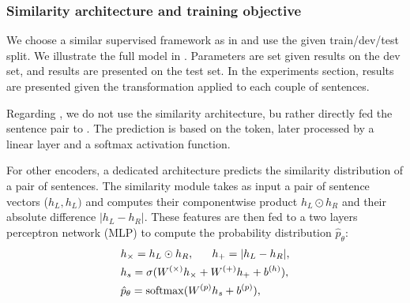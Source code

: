 \subsubsection{Similarity architecture and training objective}
\label{sec:training-setup}
We choose a similar supervised framework as in \textcite{tai_15} and use the given train/dev/test split. We illustrate the full model in . Parameters are set given results on the dev set, and results are presented on the test set. In the experiments section, results are presented given the transformation applied to each couple of sentences. 





Regarding \bert, we do not use the similarity architecture, bu rather directly fed the sentence pair to \bert. The prediction is based on the \cls token, later processed by a linear layer and a softmax activation function.

For other encoders, a dedicated architecture predicts the similarity distribution of a pair of sentences. The similarity module takes as input a pair of sentence vectors ($h_{L}, h_{L})$ and computes their component\-wise product $h_{L} \odot h_{R}$ and their absolute difference $|h_{L} - h_{R}|$. These features are then fed to a two layers perceptron network (MLP) to compute the probability distribution  $\hat{p}_{\theta}$:
\begin{align}
\begin{split}
&h_{\times}=h_L\odot h_R, ~~~~~h_{+} = |h_L - h_R |, \\
&h_s = \sigma (W^{(\times)}h_{\times} + W^{(+)}h_{+} + b^{(h)}), \\
&\hat{p}_{\theta} = \operatorname{softmax}(W^{(p)}h_s + b^{(p)}),\\
\end{split}
\end{align}

